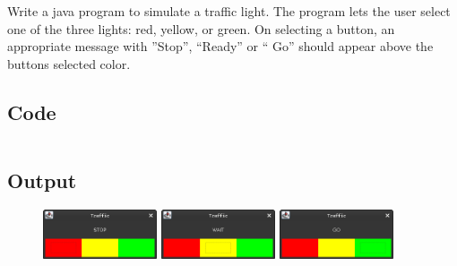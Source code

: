 \documentclass[../main.tex]{subfiles}
\begin{document}
Write a java program to simulate a traffic light. The program lets the user
select one of the three lights: red, yellow, or green. On selecting a button,
an appropriate message with ”Stop”, “Ready” or “ Go” should appear above the
buttons selected color.

\subsection{Code}
\inputminted[frame=lines, breaklines, breakanywhere, numberblanklines=false]{java}{./programs/prog13/Traffic.java}

\subsection{Output}
\begin{figure}[h!]
	\centering
	\includegraphics[width=0.3\textwidth]{./assets/p13-s1.png}
	\includegraphics[width=0.3\textwidth]{./assets/p13-s2.png}
	\includegraphics[width=0.3\textwidth]{./assets/p13-s3.png}
\end{figure}
\end{document}
